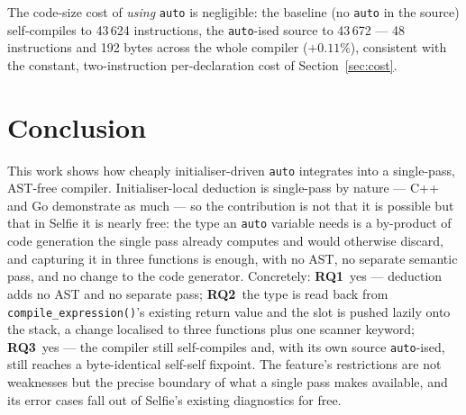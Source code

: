\documentclass[a4paper,11pt]{article}
\begin{document}
The code-size cost of \emph{using} \texttt{auto} is negligible: the baseline (no \texttt{auto} in the source) self-compiles to 43\,624 instructions, the \texttt{auto}-ised source to 43\,672 --- 48 instructions and 192 bytes across the whole compiler ($+0.11\%$), consistent with the constant, two-instruction per-declaration cost of Section~\ref{sec:cost}.

\section{Conclusion}
\label{sec:conclusion}

This work shows how cheaply initialiser-driven \texttt{auto} integrates into a single-pass, AST-free compiler. Initialiser-local deduction is single-pass by nature --- C++ and Go demonstrate as much --- so the contribution is not that it is possible but that in Selfie it is nearly free: the type an \texttt{auto} variable needs is a by-product of code generation the single pass already computes and would otherwise discard, and capturing it in three functions is enough, with no AST, no separate semantic pass, and no change to the code generator. Concretely: \textbf{RQ1}~yes --- deduction adds no AST and no separate pass; \textbf{RQ2}~the type is read back from \texttt{compile\_expression()}'s existing return value and the slot is pushed lazily onto the stack, a change localised to three functions plus one scanner keyword; \textbf{RQ3}~yes --- the compiler still self-compiles and, with its own source \texttt{auto}-ised, still reaches a byte-identical self-self fixpoint. The feature's restrictions are not weaknesses but the precise boundary of what a single pass makes available, and its error cases fall out of Selfie's existing diagnostics for free.
\end{document}
